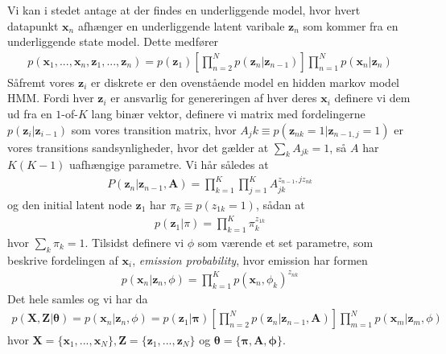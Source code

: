 \documentclass[paper=a4, fontsize=11pt]{scrartcl} %
\numberwithin{equation}{section} %
\numberwithin{figure}{section} %
\numberwithin{table}{section} %
\begin{document}
	Vi kan i stedet antage at der findes en underliggende model, hvor hvert datapunkt $\mathbf{x}_n$ afhænger en underliggende latent varibale $\mathbf{z}_n$ som kommer fra en underliggende state model. Dette medfører
	\begin{align*}
	p(\mathbf{x}_1,...,\mathbf{x}_n,\mathbf{z}_1,...,\mathbf{z}_n)=p(\mathbf{z}_1)\left[\prod_{n=2}^{N}p(\mathbf{z}_n|\mathbf{z}_{n-1})\right]\prod_{n=1}^{N}p(\mathbf{x}_n|\mathbf{z}_n)
	\end{align*}
	Såfremt vores $\mathbf{z}_i$ er diskrete er den ovenstående model en hidden markov model HMM. Fordi hver $\mathbf{z}_i$ er ansvarlig for genereringen af hver deres $\mathbf{x}_i$ definere vi dem ud fra en $1$-of-$K$ lang binær vektor, definere vi matrix med fordelingerne $p(\mathbf{z}_i|\mathbf{z}_{i-1})$ som vores transition matrix, hvor $A_jk\equiv p(\mathbf{z}_{nk}=1|\mathbf{z}_{n-1,j}=1)$ er vores transitions sandsynligheder, hvor det gælder at $\sum_k A_{jk}=1$, så $A$ har $K(K-1)$ uafhængige parametre. Vi hår således at
	\begin{align*}
	P(\mathbf{z}_n|\mathbf{z}_{n-1}, \mathbf{A})=\prod_{k=1}^{K}\prod_{j=1}^{K}A_{jk}^{z_{n-1},jz_{nk}}
	\end{align*}
	og den initial latent node $\mathbf{z}_1$ har $\pi_k\equiv p(z_{1k}=1)$, sådan at
	\begin{align*}
	p(\mathbf{z}_1|\pi)=\prod_{k=1}^{K}\pi_k^{z_{1k}}
	\end{align*}
	hvor $\sum_k \pi_k=1$. Tilsidst definere vi $\phi$ som værende et set parametre, som beskrive fordelingen af $\mathbf{x}_i$, \textit{emission probability}, hvor emission har formen
	\begin{align*}
	p(\mathbf{x}_n|\mathbf{z}_n,\phi)=\prod_{k=1}^{K}p(\mathbf{x}_n,\phi_k)^{z_{nk}}
	\end{align*}
	Det hele samles og vi har da
	\begin{align*}
	p(\mathbf{X},\mathbf{Z}|\mathbf{\theta})=p(\mathbf{x}_n|\mathbf{z}_n,\phi)=p(\mathbf{z}_1|\mathbf{\pi})\left[\prod_{n=2}^{N}p(\mathbf{z}_n|\mathbf{z}_{n-1},\mathbf{A})\right]\prod_{m=1}^{N}p(\mathbf{x}_m|\mathbf{z}_m,\phi)
	\end{align*}
	hvor $\mathbf{X}=\{\mathbf{x}_1,...,\mathbf{x}_N\}, \mathbf{Z}=\{\mathbf{z}_1,...,\mathbf{z}_N\}$ og $\mathbf{\theta}=\{\mathbf{\pi},\mathbf{A}, \mathbf{\phi}\}$.\\
	
\end{document}
